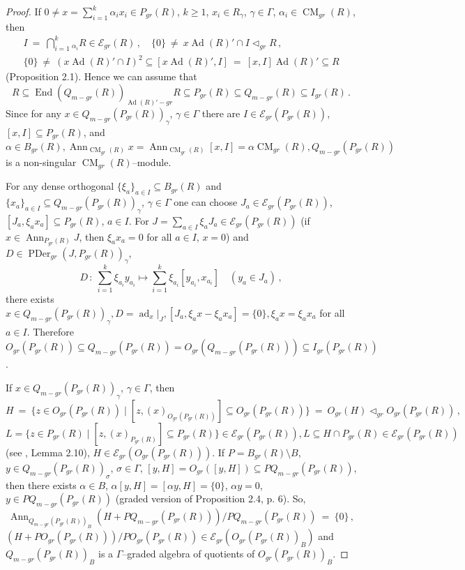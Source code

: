 \documentclass[a4paper,11pt]{article}
\DeclareMathOperator{\ad}{ad}
\DeclareMathOperator{\Ad}{Ad}
\DeclareMathOperator{\End}{End}
\DeclareMathOperator{\CM}{CM}
\DeclareMathOperator{\Ann}{Ann}
\DeclareMathOperator{\PDer}{PDer}
\begin{document}
\begin{proof}
If ${0\ne x=\sum\limits_{i=1}^k \alpha_i x_i\in P_{gr}(R)}$, ${k\geq 1}$, 
${x_i\in R_{\gamma}}$, ${\gamma\in \Gamma}$, ${\alpha_i\in \CM_{gr}(R)}$, 
then 
\begin{gather*}
I\ =\ \bigcap_{i=1}^k {}_{\alpha_i} R\in \mathcal{E}_{gr}(R)\,,\quad 
\{0\}\ \ne\ x \Ad(R)'\cap I\lhd_{gr} R\,,
\\ 
\{0\}\ \ne\ (x \Ad(R)'\cap I)^2\subseteq [x \Ad(R)', I]\ =\ [x, I] \Ad(R)'\subseteq R
\end{gather*}
(Proposition 2.1). Hence we can assume that 
\[
R\subseteq \End(Q_{m-gr}(R))_{\Ad(R)'-gr} R\subseteq 
P_{gr}(R)\subseteq Q_{m-gr}(R)\subseteq I_{gr}(R)\,.
\]
Since for any ${x\in Q_{m-gr}(P_{gr}(R))_{\gamma}}$, ${\gamma\in \Gamma}$ 
there are ${I\in \mathcal{E}_{gr}(P_{gr}(R))}$, ${[x, I]\subseteq P_{gr}(R)}$, 
and ${\alpha\in B_{gr}(R), 
\Ann_{\CM_{gr}(R)} x=\Ann_{\CM_{gr}(R)} [x, I]=\alpha \CM_{gr}(R),
Q_{m-gr}(P_{gr}(R))}$ is a non-singular $\CM_{gr}(R)$--module. 

For any dense orthogonal ${\{\xi_a\}_{a\in I}\subseteq B_{gr}(R)}$ and 
${\{x_a\}_{a\in I}\subseteq Q_{m-gr}(P_{gr}(R))_{\gamma}}$, 
${\gamma\in \Gamma}$ one can choose ${J_a\in \mathcal{E}_{gr}(P_{gr}(R))}$, 
${[J_a, \xi_a x_a]\subseteq P_{gr}(R)}$, ${a\in I}$. 
For ${J=\sum\limits_{a\in I} \xi_a J_a\in \mathcal{E}_{gr}(P_{gr}(R))}$ 
(if ${x\in \Ann_{P_{gr}(R)} J}$, then ${\xi_a x_a=0}$ for all ${a\in I}$, 
${x=0}$) and ${D\in \PDer_{gr}(J, P_{gr}(R))_{\gamma}}$, 
\[
D\,:\ \sum_{i=1}^k \xi_{a_i} y_{a_i}\longmapsto 
\sum_{i=1}^k \xi_{a_i} [y_{a_i}, x_{a_i}]\quad (y_a\in J_a)\,,
\]
there exists ${x\in Q_{m-gr}(P_{gr}(R))_{\gamma}, D=\ad_x|_J, 
[J_a, \xi_a x-\xi_a x_a]=\{0\}, \xi_a x=\xi_a x_a}$ for all ${a\in I}$. Therefore 
${O_{gr}(P_{gr}(R))\subseteq 
Q_{m-gr}(P_{gr}(R))=O_{gr}(Q_{m-gr}(P_{gr}(R)))\subseteq I_{gr}(P_{gr}(R))}$. 

If ${x\in Q_{m-gr}(P_{gr}(R))_{\gamma}}$, ${\gamma\in \Gamma}$, then 
\[
H\ =\ \{z\in O_{gr}(P_{gr}(R))\mid [z, (x)_{O_{gr}(P_{gr}(R))}]\subseteq 
O_{gr}(P_{gr}(R))\}\ =\ O_{gr}(H) \lhd_{gr} O_{gr}(P_{gr}(R))\,,
\]
${L=\{z\in P_{gr}(R)\mid [z, (x)_{P_{gr}(R)}]\subseteq P_{gr}(R)\}\in 
\mathcal{E}_{gr}(P_{gr}(R)), 
L\subseteq H\cap P_{gr}(R)\in \mathcal{E}_{gr}(P_{gr}(R))}$ (see \cite{Mol}, 
Lemma 2.10), ${H\in \mathcal{E}_{gr}(O_{gr}(P_{gr}(R)))}$. 
If ${P=B_{gr}(R)\setminus B}$, ${y\in Q_{m-gr}(P_{gr}(R))_{\sigma}}$, 
${\sigma\in \Gamma}$, ${[y, H]=O_{gr}([y, H])\subseteq P Q_{m-gr}(P_{gr}(R))}$, 
then there exists ${\alpha\in B}$, ${\alpha [y, H]=[\alpha y, H]=\{0\}}$, 
${\alpha y=0}$, ${y\in P Q_{m-gr}(P_{gr}(R))}$ (graded version of 
Proposition 2.4, p. 6). So, 
\[
\Ann_{Q_{m-gr}(P_{gr}(R))_B} (H+P Q_{m-gr}(P_{gr}(R)))/P Q_{m-gr}(P_{gr}(R))\ =\ \{0\}\,,
\]
${(H+P O_{gr}(P_{gr}(R)))/P O_{gr}(P_{gr}(R))\in 
\mathcal{E}_{gr}(O_{gr}(P_{gr}(R))_B)}$ and $Q_{m-gr}(P_{gr}(R))_B$ is a 
$\Gamma$--graded algebra of quotients of $O_{gr}(P_{gr}(R))_B$.
\end{proof}
\end{document}
